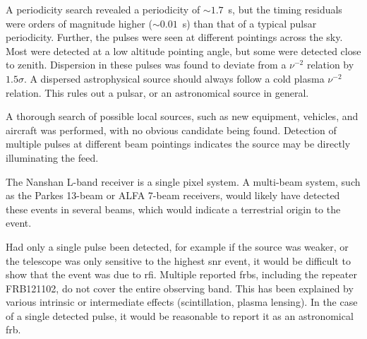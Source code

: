 \documentclass[a4paper,fleqn,usenatbib]{mnras}
\begin{document}
A periodicity search revealed a periodicity of $\sim 1.7$~s, but the timing
residuals were orders of magnitude higher ($\sim 0.01$~s) than that of a typical
pulsar periodicity. Further, the pulses were seen at different pointings across
the sky.  Most were detected at a low altitude pointing angle, but some were
detected close to zenith.  Dispersion in these pulses was found to deviate from
a $\nu^{-2}$ relation by $1.5 \sigma$. A dispersed astrophysical source should
always follow a cold plasma $\nu^{-2}$ relation.
This rules out a pulsar, or an astronomical source in general.

%

A thorough search of possible local sources, such as new equipment, vehicles,
and aircraft was performed, with no obvious candidate being found. Detection of
multiple pulses at different beam pointings indicates the source may be directly
illuminating the feed.

The Nanshan L-band receiver is a single pixel system. A multi-beam system, such
as the Parkes 13-beam or ALFA 7-beam receivers, would likely have detected these
events in several beams, which would indicate a terrestrial origin to the event.

Had only a single pulse been detected, for example if the source was weaker, or
the telescope was only sensitive to the highest \gls{snr} event, it would be
difficult to show that the event was due to \gls{rfi}.  Multiple reported
\glspl{frb}, including the repeater FRB121102, do not cover the entire observing
band. This has been explained by various intrinsic or intermediate effects
(scintillation, plasma lensing). In the case of a single detected pulse, it would
be reasonable to report it as an astronomical \gls{frb}.
\end{document}
